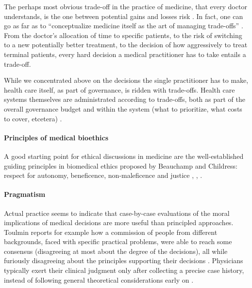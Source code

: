     The perhaps most obvious trade-off in the practice of medicine, that every doctor understands, is the one between potential gains and losses risk \cite{Launer2020}.
    In fact, one can go as far as to ``conceptualize medicine itself as the art of managing trade-offs'' \cite{Launer2020}.
    From the doctor's allocation of time to specific patients, to the risk of switching to a new potentially better treatment, to the decision of how aggressively to treat terminal patients, every hard decision a medical practitioner has to take entails a trade-off.

    While we concentrated above on the decisions the single practitioner has to make, health care itself, as part of governance, is ridden with trade-offs.
    Health care systems themselves are administrated according to trade-offs, both as part of the overall governance budget and within the system (what to prioritize, what costs to cover, etcetera) \cite{Dionne2018}. 
    \paragraph{Principles of medical bioethics}
    A good starting point for ethical discussions in medicine are the well-established guiding principles in biomedical ethics proposed by Beauchamp and Childress: respect for autonomy, beneficence, non-maleficence and justice \cite[pp.~344-345]{Dijkstra2020}, \cite[p.~2]{Morley2020}, \cite[p.~2]{Rajkomar2018}.


    \paragraph{Pragmatism}
    Actual practice seems to indicate that case-by-case evaluations of the moral implications of medical decisions are more useful than principled approaches.
    Toulmin reports for example how a commission of people from different backgrounds, faced with specific practical problems, were able to reach some consensus (disagreeing at most about the degree of the decisions), all while furiously disagreeing about the principles supporting their decisions \cite{Toulmin1982}.
    Physicians typically exert their clinical judgment only after collecting a precise case history, instead of following general theoretical considerations early on \cite{Toulmin1982}.
